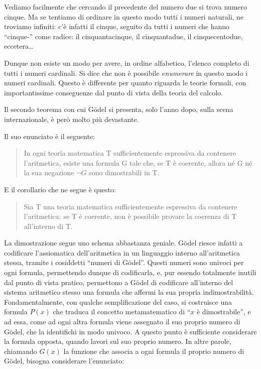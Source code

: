 \documentclass[a4paper,10pt]{article}
\begin{document}
Vediamo facilmente che cercando il precedente del numero due si trova numero cinque. Ma se tentiamo di ordinare in questo modo tutti i numeri naturali, ne troviamo infiniti: c'è infatti il cinque, seguito da tutti i numeri che hanno “cinque-” come radice: il cinquantacinque, il cinquantadue, il cinquecentodue, eccetera\dots

Dunque non esiste un modo per avere, in ordine alfabetico, l'elenco completo di tutti i numeri cardinali. Si dice che non è possibile \textit{enumerare} in questo modo i numeri cardinali. Questo è differente per quanto riguarda le teorie formali, con importantissime conseguenze dal punto di vista della teoria del calcolo.

Il secondo teorema con cui Gödel si presenta, solo l'anno dopo, sulla scena internazionale, è però molto più devastante.

Il suo enunciato è il seguente:

\begin{quote}
  In ogni teoria matematica T sufficientemente espressiva da contenere l'aritmetica, esiste una formula G tale che, se T è coerente, allora né G né la sua negazione $\neg G$ sono dimostrabili in T.
\end{quote} 

E il corollario che ne segue è questo:
\begin{quotation}
  Sia T una teoria matematica sufficientemente espressiva da contenere l'aritmetica: se T è coerente, non è possibile provare la coerenza di T all'interno di T.
\end{quotation}

La dimostrazione segue uno schema abbastanza geniale. Gödel riesce infatti a codificare l'assiomatica dell'aritmetica in un linguaggio interno all'aritmetica stessa, tramite i cosiddetti “numeri di Gödel”.
Questi numeri sono univoci per ogni formula, permettendo dunque di codificarla, e, pur essendo totalmente inutili dal punto di vista pratico, permettono a Gödel di codificare all'interno del sistema aritmetico stesso una formula che affermi la sua propria indimostrabilità.
Fondamentalmente, con qualche semplificazione del caso, si costruisce una formula $P(x)$ che traduca il concetto metamatematico di “$x$ è dimostrabile”, e ad essa, come ad ogni altra formula viene assegnato il suo proprio numero di Gödel, che la identifichi in modo univoco.
A questo punto è sufficiente considerare la formula opposta, quando lavori sul suo proprio numero.
In altre parole, chiamando $G(x)$ la funzione che associa a ogni formula il proprio numero di Gödel, bisogna considerare l'enunciato:
\end{document}

